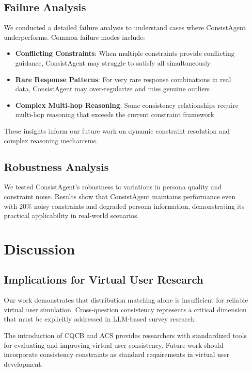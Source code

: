 \documentclass[sigconf, anonymous]{acmart}
\begin{document}
\subsection{Failure Analysis}

We conducted a detailed failure analysis to understand cases where ConsistAgent underperforms. Common failure modes include:

\begin{itemize}
    \item \textbf{Conflicting Constraints}: When multiple constraints provide conflicting guidance, ConsistAgent may struggle to satisfy all simultaneously
    \item \textbf{Rare Response Patterns}: For very rare response combinations in real data, ConsistAgent may over-regularize and miss genuine outliers
    \item \textbf{Complex Multi-hop Reasoning}: Some consistency relationships require multi-hop reasoning that exceeds the current constraint framework
\end{itemize}

These insights inform our future work on dynamic constraint resolution and complex reasoning mechanisms.

\subsection{Robustness Analysis}

We tested ConsistAgent's robustness to variations in persona quality and constraint noise. Results show that ConsistAgent maintains performance even with 20\% noisy constraints and degraded persona information, demonstrating its practical applicability in real-world scenarios.

\section{Discussion}

\subsection{Implications for Virtual User Research}

Our work demonstrates that distribution matching alone is insufficient for reliable virtual user simulation. Cross-question consistency represents a critical dimension that must be explicitly addressed in LLM-based survey research.

The introduction of CQCB and ACS provides researchers with standardized tools for evaluating and improving virtual user consistency. Future work should incorporate consistency constraints as standard requirements in virtual user development.
\end{document}
